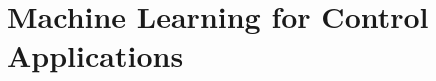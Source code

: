 \documentclass[12pt]{report}
\begin{document}
\chapter{Machine Learning for Control Applications}


% 

% 

\printbibliography

\clearpage
{}%
\renewcommand*{\thepage}{A\arabic{page}}

% 

% 

% 
\end{document}
